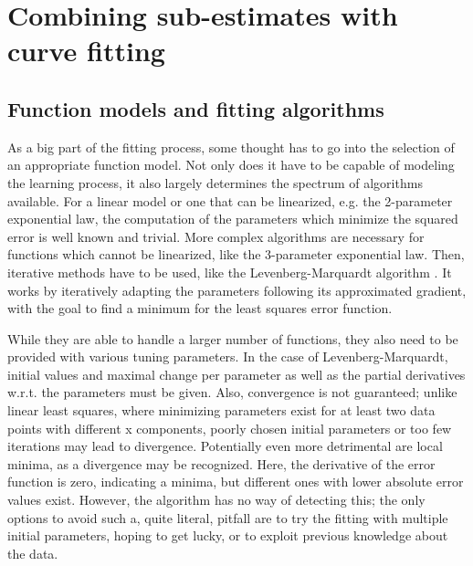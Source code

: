 \section{Combining sub-estimates with curve fitting}

\subsection{Function models and fitting algorithms}
As a big part of the fitting process, some thought has to go into the selection of an appropriate function model. Not only does it have to be capable of modeling the learning process, it also largely determines the spectrum of algorithms available. For a linear model or one that can be linearized, e.g. the 2-parameter exponential law, the computation of the parameters which minimize the squared error is well known and trivial. More complex algorithms are necessary for functions which cannot be linearized, like the 3-parameter exponential law. Then, iterative methods have to be used, like the Levenberg-Marquardt algorithm \cite{Levenberg1944}. It works by iteratively adapting the parameters following its approximated gradient, with the goal to find a minimum for the least squares error function.

While they are able to handle a larger number of functions, they also need to be provided with various tuning parameters. In the case of Levenberg-Marquardt, initial values and maximal change per parameter as well as the partial derivatives w.r.t. the parameters must be given. Also, convergence is not guaranteed; unlike linear least squares, where minimizing parameters exist for at least two data points with different x components, poorly chosen initial parameters or too few iterations may lead to divergence. Potentially even more detrimental are local minima, as a divergence may be recognized. Here, the derivative of the error function is zero, indicating a minima, but different ones with lower absolute error values exist. However, the algorithm has no way of detecting this; the only options to avoid such a, quite literal, pitfall are to try the fitting with multiple initial parameters, hoping to get lucky, or to exploit previous knowledge about the data.

